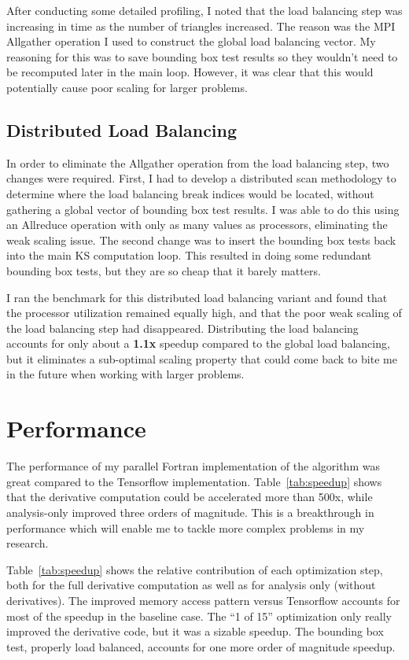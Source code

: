 \documentclass[11pt,letterpaper]{article}
\begin{document}
\qquad After conducting some detailed profiling, I noted that the load balancing step was increasing in time as the number of triangles increased.
The reason was the MPI Allgather operation I used to construct the global load balancing vector.
My reasoning for this was to save bounding box test results so they wouldn't need to be recomputed later in the main loop.
However, it was clear that this would potentially cause poor scaling for larger problems.

\subsection{Distributed Load Balancing}
\qquad In order to eliminate the Allgather operation from the load balancing step, two changes were required.
First, I had to develop a distributed scan methodology to determine where the load balancing break indices would be located, without gathering a global vector of bounding box test results.
I was able to do this using an Allreduce operation with only as many values as processors, eliminating the weak scaling issue.
The second change was to insert the bounding box tests back into the main KS computation loop.
This resulted in doing some redundant bounding box tests, but they are so cheap that it barely matters.

\qquad I ran the benchmark for this distributed load balancing variant and found that the processor utilization remained equally high, and that the poor weak scaling of the load balancing step had disappeared.
Distributing the load balancing accounts for only about a \textbf{1.1x} speedup compared to the global load balancing, but it eliminates a sub-optimal scaling property that could come back to bite me in the future when working with larger problems.


\section{Performance}
\qquad The performance of my parallel Fortran implementation of the algorithm was great compared to the Tensorflow implementation.
Table~\ref{tab:speedup} shows that the derivative computation could be accelerated more than 500x, while analysis-only improved three orders of magnitude.
This is a breakthrough in performance which will enable me to tackle more complex problems in my research.

\qquad Table~\ref{tab:speedup} shows the relative contribution of each optimization step, both for the full derivative computation as well as for analysis only (without derivatives).
The improved memory access pattern versus Tensorflow accounts for most of the speedup in the baseline case.
The ``1 of 15'' optimization only really improved the derivative code, but it was a sizable speedup.
The bounding box test, properly load balanced, accounts for one more order of magnitude speedup.
\end{document}
